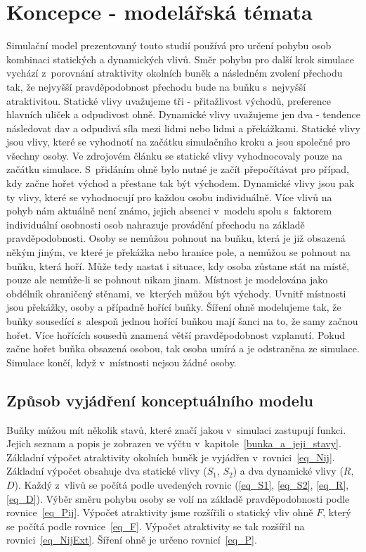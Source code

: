 \documentclass[11pt, titlepage, a4paper]{article}
\begin{document}
\section{Koncepce - modelářská témata}
\label{koncepce_modelarska_temata}
Simulační model prezentovaný touto studií používá pro určení pohybu osob kombinaci statických a dynamických vlivů. Směr pohybu pro další krok simulace vychází z~porovnání atraktivity okolních buněk a následném zvolení přechodu tak, že nejvyšší pravděpodobnost přechodu bude na buňku s~nejvyšší atraktivitou. Statické vlivy uvažujeme tři - přitažlivost východů, preference hlavních uliček a odpudivost ohně. Dynamické vlivy uvažujeme jen dva - tendence následovat dav a odpudivá síla mezi lidmi nebo lidmi a překážkami. Statické vlivy jsou vlivy, které se vyhodnotí na začátku simulačního kroku a jsou společné pro všechny osoby. Ve zdrojovém článku se statické vlivy vyhodnocovaly pouze na začátku simulace. S~přidáním ohně bylo nutné je začít přepočítávat pro případ, kdy začne hořet východ a přestane tak být východem. Dynamické vlivy jsou pak ty vlivy, které se vyhodnocují pro každou osobu individuálně. Více vlivů na pohyb nám aktuálně není známo, jejich absenci v~modelu spolu s~faktorem individuální osobnosti osob nahrazuje provádění přechodu na základě pravděpodobnosti. Osoby se nemůžou pohnout na buňku, která je již obsazená někým jiným, ve které je překážka nebo hranice pole, a nemůžou se pohnout na buňku, která hoří. Může tedy nastat i situace, kdy osoba zůstane stát na místě, pouze ale nemůže-li se pohnout nikam jinam. Místnost je modelována jako obdélník ohraničený stěnami, ve~kterých můžou být východy. Uvnitř místnosti jsou překážky, osoby a případně hořící buňky. Šíření ohně modelujeme tak, že buňky sousedící s~alespoň jednou hořící buňkou mají šanci na to, že samy začnou hořet. Více hořících sousedů znamená větší pravděpodobnost vzplanutí. Pokud začne hořet buňka obsazená osobou, tak osoba umírá a je odstraněna ze simulace. Simulace končí, když v~místnosti nejsou žádné osoby.

    \subsection{Způsob vyjádření konceptuálního modelu}
    Buňky můžou mít několik stavů, které značí jakou v~simulaci zastupují funkci. Jejich seznam a popis je zobrazen ve výčtu v~kapitole~\ref{bunka_a_jeji_stavy}. Základní výpočet atraktivity okolních buněk je vyjádřen v~rovnici~\ref{eq_Nij}. Základní výpočet obsahuje dva statické vlivy ($S_1$, $S_2$) a dva dynamické vlivy ($R$, $D$). Každý z~vlivů se počítá podle uvedených rovnic (\ref{eq_S1}, \ref{eq_S2}, \ref{eq_R}, \ref{eq_D}). Výběr směru pohybu osoby se volí na základě pravděpodobnosti podle rovnice~\ref{eq_Pij}. Výpočet atraktivity jsme rozšířili o statický vliv ohně $F$, který se počítá podle rovnice~\ref{eq_F}. Výpočet atraktivity se tak rozšířil na rovnici~\ref{eq_NijExt}. Šíření ohně je určeno rovnicí~\ref{eq_P}.
\end{document}
